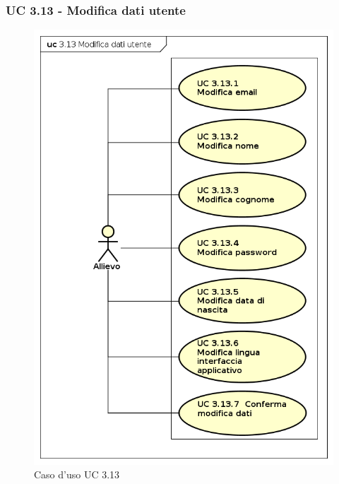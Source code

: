 \subsubsection{UC 3.13 - Modifica dati utente}
\begin{figure}[H]
	\centering
	\includegraphics[width=13cm]{img/UC313.png} 
	\caption{Caso d'uso UC 3.13}\label{fig:312}
\end{figure}
